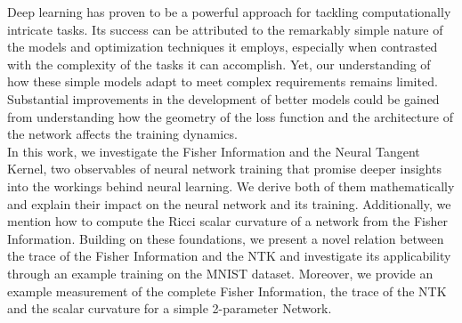 Deep learning has proven to be a powerful approach for tackling computationally intricate tasks. Its success can be attributed to the remarkably simple nature of the models and optimization techniques it employs, especially when contrasted with the complexity of the tasks it can accomplish. Yet, our understanding of how these simple models adapt to meet complex requirements remains limited. Substantial improvements in the development of better models could be gained from understanding how the geometry of the loss function and the architecture of the network affects the training dynamics.\\
In this work, we investigate the Fisher Information and the Neural Tangent Kernel, two observables of neural network training that promise deeper insights into the workings behind neural learning. We derive both of them mathematically and explain their impact on the neural network and its training. Additionally, we mention how to compute the Ricci scalar curvature of a network from the Fisher Information. Building on these foundations, we present a novel relation between the trace of the Fisher Information and the NTK and investigate its applicability through an example training on the MNIST dataset. Moreover, we provide an example measurement of the complete Fisher Information, the trace of the NTK and the scalar curvature for a simple 2-parameter Network.